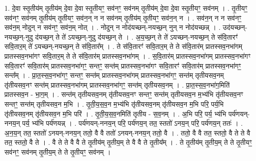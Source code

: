 \documentclass[17pt]{extarticle}
\begin{document}
1. दे॒वा स्तृ॒तीय॑म् तृ॒तीय॑म् दे॒वा दे॒वा स्तृ॒तीयꣳ॒॒ सव॑नꣳ॒॒ सव॑नम् तृ॒तीय॑म् दे॒वा दे॒वा स्तृ॒तीयꣳ॒॒ सव॑नम् । . तृ॒तीयꣳ॒॒ सव॑नꣳ॒॒ सव॑नम् तृ॒तीय॑म् तृ॒तीयꣳ॒॒ सव॑न॒न् न न सव॑नम् तृ॒तीय॑म् तृ॒तीयꣳ॒॒ सव॑न॒न् न । . सव॑न॒न् न न सव॑नꣳ॒॒ सव॑न॒म् नोदुन् न सव॑नꣳ॒॒ सव॑न॒म् नोत् । . नोदुन् न नोद॑यच्छन्-नयच्छ॒न् नुन् न नोद॑यच्छन्न् । . उद॑यच्छन्-नयच्छ॒न्-नुदु द॑यच्छ॒न् ते ते॑ ऽयच्छ॒न्-नुदु द॑यच्छ॒न् ते । . अ॒य॒च्छ॒न् ते ते॑ ऽयच्छन्-नयच्छ॒न् ते स॑वि॒तारꣳ॑ सवि॒तार॒म् ते॑ ऽयच्छन्-नयच्छ॒न् ते स॑वि॒तार᳚म् । . ते स॑वि॒तारꣳ॑ सवि॒तार॒म् ते ते स॑वि॒तार॑म् प्रातस्सव॒नभा॑गम् प्रातस्सव॒नभा॑गꣳ सवि॒तार॒म् ते ते स॑वि॒तार॑म् प्रातस्सव॒नभा॑गम् । . स॒वि॒तार॑म् प्रातस्सव॒नभा॑गम् प्रातस्सव॒नभा॑गꣳ सवि॒तारꣳ॑ सवि॒तार॑म् प्रातस्सव॒नभा॑गꣳ॒॒ सन्तꣳ॒॒ सन्त॑म् प्रातस्सव॒नभा॑गꣳ सवि॒तारꣳ॑ सवि॒तार॑म् प्रातस्सव॒नभा॑गꣳ॒॒ सन्त᳚म् । . प्रा॒त॒स्स॒व॒नभा॑गꣳ॒॒ सन्तꣳ॒॒ सन्त॑म् प्रातस्सव॒नभा॑गम् प्रातस्सव॒नभा॑गꣳ॒॒ सन्त॑म् तृतीयसव॒नम् तृ॑तीयसव॒नꣳ सन्त॑म् प्रातस्सव॒नभा॑गम् प्रातस्सव॒नभा॑गꣳ॒॒ सन्त॑म् तृतीयसव॒नम् । . प्रा॒त॒स्स॒व॒नभा॑ग॒मिति॑ प्रातस्सव॒न - भा॒ग॒म् । . सन्त॑म् तृतीयसव॒नम् तृ॑तीयसव॒नꣳ सन्तꣳ॒॒ सन्त॑म् तृतीयसव॒न म॒भ्य॑भि तृ॑तीयसव॒नꣳ सन्तꣳ॒॒ सन्त॑म् तृतीयसव॒न म॒भि । . तृ॒ती॒य॒स॒व॒न म॒भ्य॑भि तृ॑तीयसव॒नम् तृ॑तीयसव॒न म॒भि परि॒ पर्य॒भि तृ॑तीयसव॒नम् तृ॑तीयसव॒न म॒भि परि॑ । . तृ॒ती॒य॒स॒व॒नमिति॑ तृतीय - स॒व॒नम् । . अ॒भि परि॒ पर्य॒ भ्य॑भि पर्य॑णयन्-ननय॒न् पर्य॒ भ्य॑भि पर्य॑णयन्न् । . पर्य॑णयन्-ननय॒न् परि॒ पर्य॑णय॒न् तत॒ स्ततो॑ ऽनय॒न् परि॒ पर्य॑णय॒न् ततः॑ । . अ॒न॒य॒न् तत॒ स्ततो॑ ऽनयन्-ननय॒न् ततो॒ वै वै ततो॑ ऽनयन्-ननय॒न् ततो॒ वै । . ततो॒ वै वै तत॒ स्ततो॒ वै ते ते वै तत॒ स्ततो॒ वै ते । . वै ते ते वै वै ते तृ॒तीय॑म् तृ॒तीय॒म् ते वै वै ते तृ॒तीय᳚म् । . ते तृ॒तीय॑म् तृ॒तीय॒म् ते ते तृ॒तीयꣳ॒॒ सव॑नꣳ॒॒ सव॑नम् तृ॒तीय॒म् ते ते तृ॒तीयꣳ॒॒ सव॑नम् । \newline
\end{document}

